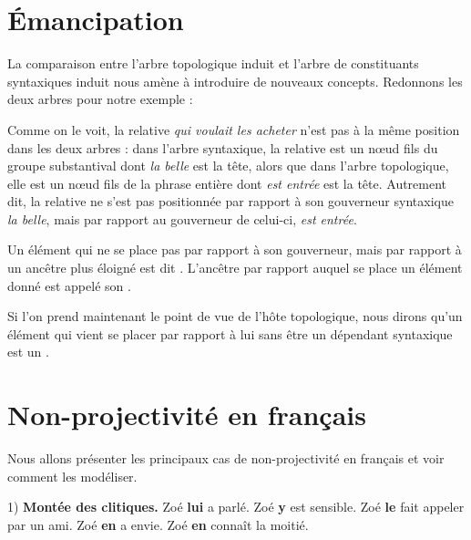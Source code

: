 \section{Émancipation}\label{sec:3.5.31}

La comparaison entre l’arbre topologique induit et l’arbre de constituants syntaxiques induit nous amène à introduire de nouveaux concepts. Redonnons les deux arbres pour notre exemple :

\begin{figure}\bfseries

\caption{\label{fig:Arbres de constituants syntaxiques et topologiques}}

\end{figure}

Comme on le voit, la relative \textit{qui voulait les acheter} n’est pas à la même position dans les deux arbres : dans l’arbre syntaxique, la relative est un nœud fils du groupe substantival dont \textit{la belle} est la tête, alors que dans l’arbre topologique, elle est un nœud fils de la phrase entière dont \textit{est entrée} est la tête. Autrement dit, la relative ne s’est pas positionnée par rapport à son gouverneur syntaxique \textit{la belle}, mais par rapport au gouverneur de celui-ci, \textit{est entrée}.

\begin{styleLivreImportant}
Un élément qui ne se place pas par rapport à son gouverneur, mais par rapport à un ancêtre plus éloigné est dit . L’ancêtre par rapport auquel se place un élément donné est appelé son .
\end{styleLivreImportant}

Si l’on prend maintenant le point de vue de l’hôte topologique, nous dirons qu’un élément qui vient se placer par rapport à lui sans être un dépendant syntaxique est un .

\section{Non-projectivité en français}\label{sec:3.5.32}

Nous allons présenter les principaux cas de non-projectivité en français et voir comment les modéliser.

1) \textbf{Montée des clitiques.}
\ea
\ea
{Zoé} \textbf{{lui}}  {a parlé.}
\ex
 {Zoé} \textbf{{y}}  {est sensible.}
\ex
 {Zoé} \textbf{{le}}  {fait appeler par un ami.}
\ex
 {Zoé} \textbf{{en}}  {a envie.}
\ex
 {Zoé} \textbf{{en}}  {connaît la moitié.}
\z
\z

